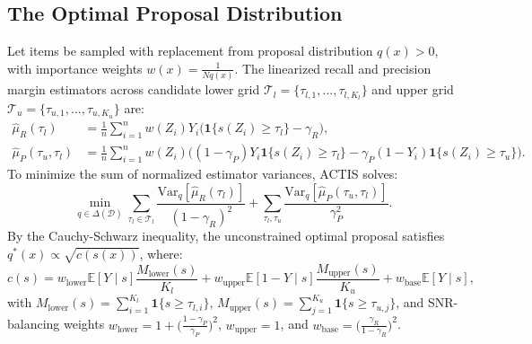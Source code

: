 \documentclass[11pt,a4paper]{article}
\newcommand{\indicator}[1]{\mathbf{1}\{#1\}}
\newcommand{\D}{\mathcal{D}}
\newcommand{\E}{\mathbb{E}}
\newcommand{\var}{\mathrm{Var}}
\begin{document}
\subsection{The Optimal Proposal Distribution}
Let items be sampled with replacement from proposal distribution $q(x) > 0$, with importance weights $w(x) = \frac{1}{N q(x)}$.
The linearized recall and precision margin estimators across candidate lower grid $\mathcal{T}_l = \{\tau_{l, 1}, \dots, \tau_{l, K_l}\}$ and upper grid $\mathcal{T}_u = \{\tau_{u, 1}, \dots, \tau_{u, K_u}\}$ are:
\begin{align}
\hat{\mu}_R(\tau_l) &= \frac{1}{n} \sum_{i=1}^n w(Z_i) Y_i \big(\indicator{s(Z_i) \ge \tau_l} - \gamma_R\big), \\
\hat{\mu}_P(\tau_u, \tau_l) &= \frac{1}{n} \sum_{i=1}^n w(Z_i) \Big( (1 - \gamma_P) Y_i \indicator{s(Z_i) \ge \tau_l} - \gamma_P (1 - Y_i) \indicator{s(Z_i) \ge \tau_u} \Big).
\end{align}
To minimize the sum of normalized estimator variances, ACTIS solves:
\begin{equation}
\min_{q \in \Delta(\D)} \sum_{\tau_l \in \mathcal{T}_l} \frac{\var_q[\hat{\mu}_R(\tau_l)]}{(1 - \gamma_R)^2} + \sum_{\tau_l, \tau_u} \frac{\var_q[\hat{\mu}_P(\tau_u, \tau_l)]}{\gamma_P^2}.
\end{equation}
By the Cauchy-Schwarz inequality, the unconstrained optimal proposal satisfies $q^*(x) \propto \sqrt{c(s(x))}$, where:
\begin{equation}\label{eq:c_s_unclipped}
c(s) = w_{\text{lower}} \E[Y \mid s] \frac{M_{\text{lower}}(s)}{K_l} + w_{\text{upper}} \E[1 - Y \mid s] \frac{M_{\text{upper}}(s)}{K_u} + w_{\text{base}} \E[Y \mid s],
\end{equation}
with $M_{\text{lower}}(s) = \sum_{i=1}^{K_l} \indicator{s \ge \tau_{l, i}}$, $M_{\text{upper}}(s) = \sum_{j=1}^{K_u} \indicator{s \ge \tau_{u, j}}$, and SNR-balancing weights $w_{\text{lower}} = 1 + \big(\frac{1 - \gamma_P}{\gamma_P}\big)^2$, $w_{\text{upper}} = 1$, and $w_{\text{base}} = \big(\frac{\gamma_R}{1 - \gamma_R}\big)^2$.
\end{document}

